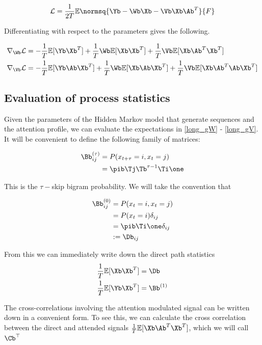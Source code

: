 \documentclass{article}
\begin{document}
\begin{equation}\label{loss}
     \mathcal{L} = \frac{1}{2T} \mathbb{E}\normsq{\Yb - \Wb \Xb - \Vb \Xb \Ab^T}{F}
\end{equation}

Differentiating with respect to the parameters gives the following.

\begin{align}
     \nabla_{\Wb}\mathcal{L} &= - \frac{1}{T}\mathbb{E}[\Yb\Xb^T] + \frac{1}{T}\Wb\mathbb{E}[\Xb\Xb^T] + \frac{1}{T}\Vb\mathbb{E}[\Xb \Ab^T\Xb^T]  \label{long_gW}\\ 
     \nabla_{\Vb}\mathcal{L} &= - \frac{1}{T}\mathbb{E}[\Yb\Ab\Xb^T] + \frac{1}{T}\Wb\mathbb{E}[\Xb\Ab\Xb^T] + \frac{1}{T}\Vb\mathbb{E}[\Xb \Ab^T\Ab\Xb^T]\label{long_gV}
\end{align}

\subsection{Evaluation of process statistics}
Given the parameters of the Hidden Markov model that generate sequences and the attention profile, we can evaluate the expectations in \eqref{long_gW} - \eqref{long_gV}. It will be convenient to define the following family of matrices:

\begin{align}
    \Bb^{(\tau)}_{ij} &= P(x_{t+\tau} = i, x_{t} = j) \label{btau}\\
    &= \pib \Tj \Tb^{\tau-1} \Ti \one
\end{align}

This is the $\tau-$skip bigram probability. We will take the convention that 

\begin{align}
    \Bb^{(0)}_{ij} &= P(x_{t} = i, x_{t} = j) \label{b0}\\
    &= P(x_t = i)\delta_{ij}\\
    &= \pib \Ti \one \delta_{ij} \\
    &:= \Db_{ij}
\end{align}

From this we can immediately write down the direct path statistics
\begin{align}
    \frac{1}{T}\mathbb{E}[\Xb\Xb^T] &= \Db \label{XX}\\
    \frac{1}{T}\mathbb{E}[\Yb\Xb^T] &= \Bb^{(1)} \label{YX}
\end{align}

The cross-correlations involving the attention modulated signal can be written down in a convenient form. To see this, we can calculate the cross correlation between the direct and attended signals $\frac{1}{T}\mathbb{E}[\Xb \Ab^T \Xb^T]$, which we will call $\Cb^\top$
\end{document}
